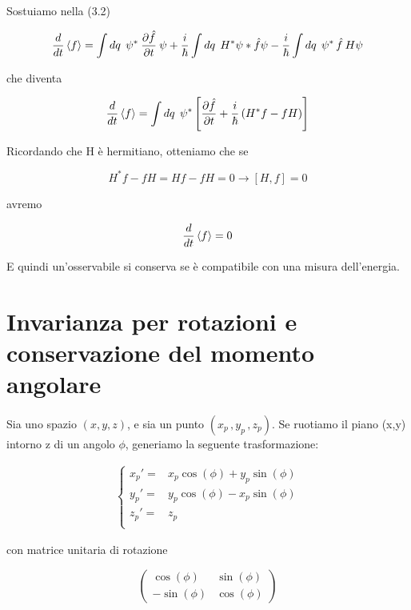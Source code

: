 Sostuiamo nella (3.2)

\begin{equation}
\frac{d}{dt}\braket{f} =  
\int dq \:\: \psi^* \: \frac{\partial \hat f}{\partial t} \: \psi + 
\frac{i}{\hbar} \int dq \:\: H^*\psi* \hat f \psi - 
\frac{i}{\hbar} \int dq \:\: \psi^* \, \hat f \: H\psi
\end{equation}

che diventa

\begin{equation}
\frac{d}{dt}\braket{f} =  
\int dq \:\: \psi^* \left[ \frac{\partial \hat f}{\partial t}
+ \frac{i}{\hbar} \left( H^* f - f H \right) \right]
\end{equation}

Ricordando che H è hermitiano, otteniamo che se

\begin{equation}
H^* f - f H = Hf - fH = 0 \rightarrow [H,f]=0 
\end{equation}

avremo

\begin{equation}
\frac{d}{dt}\braket{f} = 0 \\ 
\end{equation}

E quindi un'osservabile si conserva se è compatibile con una misura dell'energia.
\newpage

\section{Invarianza per rotazioni e conservazione del momento angolare}

Sia uno spazio $(x,y,z)$, e sia un punto $(x_p \, , y_p\, , z_p)$. Se ruotiamo il piano (x,y) intorno z di un angolo $\phi$, generiamo la seguente trasformazione:


\begin{align}
\left\{\begin{array}{ccc}
x_p' ={}& x_p \cos(\phi) + y_p \sin(\phi) \\ 
y_p' = & y_p \cos(\phi) - x_p \sin(\phi) \\
z_p' = & z_p \qquad \qquad \qquad \qquad \\
\end{array}\right. 
\end{align}

con matrice unitaria di rotazione

\begin{equation}
\left(
 \begin{array}{ccc}

\cos(\phi) & \sin(\phi) \\
-\sin(\phi) & \cos(\phi) 
 
\end{array}  
\right)
\end{equation}

